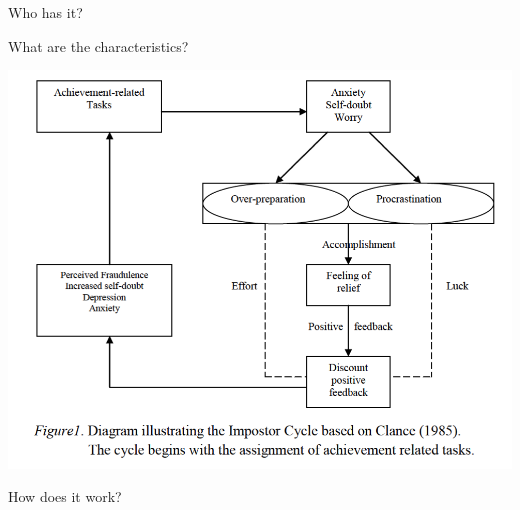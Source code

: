 \documentclass[aspectratio=169]{beamer}
\begin{document}
\begin{frame}
  \begin{center}
    \Huge Who has it?
    \\ \small \cite{clanceimes78}
  \end{center}
\end{frame}

\begin{frame}
  \begin{center}
    \Huge What are the characteristics?
  \end{center}
\end{frame}

\begin{frame}
  \begin{center}
    \includegraphics[scale=.5]{./assets/clance-impostor-cycle.png}
    \\ \small \cite{sakulku11}
  \end{center}
\end{frame}

\begin{frame}
  \begin{center}
    \Huge How does it work?
    \\ \small \cite{hh15}
  \end{center}
\end{frame}
\end{document}
